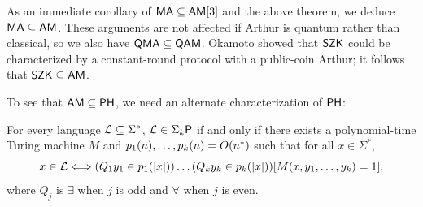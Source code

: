 As an immediate corollary of $\mathsf{MA}\subseteq\mathsf{AM}[3]$ and the above 
theorem, we deduce $\mathsf{MA}\subseteq\mathsf{AM}$. These arguments are not 
affected if Arthur is quantum rather than classical, so we also have 
$\mathsf{QMA}\subseteq\mathsf{QAM}$. Okamoto \cite{okamoto2000relationships} showed that 
$\mathsf{SZK}$ could be characterized by a constant-round protocol with a public-coin 
Arthur; it follows that $\mathsf{SZK}\subseteq\mathsf{AM}$.

To see that $\mathsf{AM}\subseteq\mathsf{PH}$, we need an alternate characterization 
of $\mathsf{PH}$:
\begin{lemma}
For every language $\mathcal{L}\subseteq\Sigma^*$, $\mathcal{L}\in\Sigma_k\mathsf{P}$ if and only if 
there exists a polynomial-time Turing machine $M$ and 
$p_1(n),\ldots,p_k(n)=O(n^*)$ such that for all $x\in\Sigma^*$,
\[
x\in\mathcal{L}\Longleftrightarrow
(Q_1 y_1\in p_1(|x|))\ldots(Q_k y_k\in p_k(|x|))
[M(x,y_1,\ldots,y_k)=1],
\]
where $Q_j$ is $\exists$ when $j$ is odd and $\forall$ when $j$ is even.
\end{lemma}
